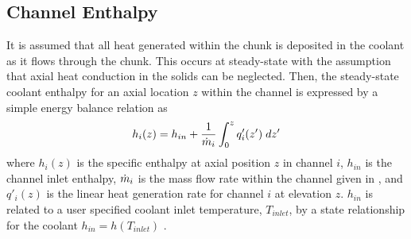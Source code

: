   \subsection{Channel Enthalpy}
    It is assumed that all heat generated within the chunk is deposited in the
    coolant as it flows through the chunk. This occurs at steady-state with the
    assumption that axial heat conduction in the solids can be neglected. Then, 
    the steady-state coolant enthalpy for an axial location $z$ within the 
    channel is expressed by a simple energy balance relation as
    \begin{equation}
      \label{eq:continuous_heat_balance}
      h_i(z) = h_{in} + \frac{1}{\dot{m}_i} \int_0^z q'_i(z') \; dz'
    \end{equation}
    where $h_i(z)$ is the specific enthalpy at axial position $z$ in channel
    $i$, $h_{in}$ is the channel inlet enthalpy, $\dot{m}_i$ is the mass flow rate
    within the channel given in , and $q'_i(z)$ is the
    linear heat generation rate for channel $i$ at elevation $z$. $h_{in}$ is
    related to a user specified coolant inlet temperature, $T_{inlet}$, by a
    state relationship for the coolant $h_{in} = h(T_{inlet})$
    \cite{sodiumProp}. 

